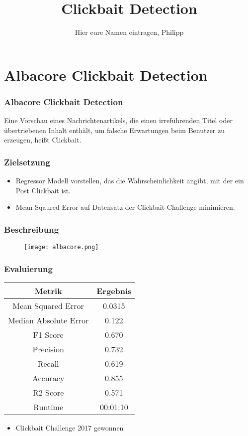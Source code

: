 \documentclass{beamer}
\author{Hier eure Namen eintragen, Philipp}
\title{Clickbait Detection}
\begin{document}
\newcommand{\pro}[1]{\item[\colorbox{green}{\textcolor{white}{\makebox(5.5,7){\textbf{+}}}}] #1}
\newcommand{\con}[1]{\item[\colorbox{red}{\textcolor{white}{\makebox(5.5,7){\textbf{--}}}}] #1}
\begin{frame}
\titlepage
\end{frame}

\section{Albacore Clickbait Detection}
\begin{frame}
\frametitle{Albacore Clickbait Detection}
    \begin{definition}
	Eine Vorschau eines Nachrichtenartikels, die einen irreführenden Titel oder übertriebenen Inhalt enthält, um falsche Erwartungen 
	beim Benutzer zu erzeugen, heißt Clickbait.
	\end{definition}
\end{frame}
\begin{frame}
    \frametitle{Zielsetzung}
	\begin{itemize}    
	\item Regressor Modell vorstellen, das die Wahrscheinlichkeit angibt, mit der ein Post Clickbait ist.
	\item Mean Sqaured Error auf Datensatz der Clickbait Challenge minimieren.
	\end{itemize}
\end{frame}
\begin{frame}
    \frametitle{Beschreibung}
    \begin{figure}
  	\texttt{[image: albacore.png]}
\end{figure}
\end{frame}
\begin{frame}
    \frametitle{Evaluierung}
    \center
    \begin{tabular}{c|c}
    Metrik & Ergebnis \\ \hline 
    Mean Squared Error & 0.0315 \\
	Median Absolute Error & 0.122 \\
	F1 Score & 0.670 \\
	Precision & 0.732 \\
	Recall & 0.619 \\
	Accuracy & 0.855 \\
	R2 Score & 0.571 \\
	Runtime & 00:01:10 \\
    \end{tabular}
	
	\begin{itemize}
	\item Clickbait Challenge 2017 gewonnen
	\end{itemize}
\end{frame}
\end{document}
